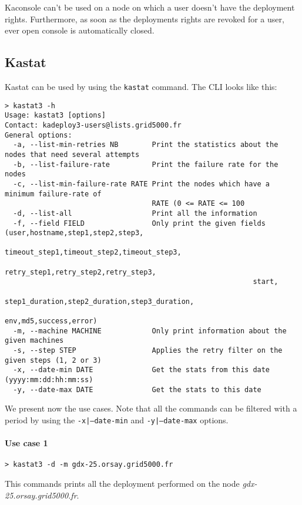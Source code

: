 \documentclass[a4wide,10pt,oneside]{book}
\begin{document}
Kaconsole can't be used on a node on which a user doesn't have the deployment rights. Furthermore, as soon as the deployments rights are revoked for a user, ever open console is automatically closed.

\subsection{Kastat}\label{sec:kastat}
Kastat can be used by using the \texttt{kastat} command. The CLI looks like this:
\begin{small}
\begin{verbatim}
> kastat3 -h
Usage: kastat3 [options]
Contact: kadeploy3-users@lists.grid5000.fr
General options:
  -a, --list-min-retries NB        Print the statistics about the nodes that need several attempts
  -b, --list-failure-rate          Print the failure rate for the nodes
  -c, --list-min-failure-rate RATE Print the nodes which have a minimum failure-rate of 
                                   RATE (0 <= RATE <= 100
  -d, --list-all                   Print all the information
  -f, --field FIELD                Only print the given fields (user,hostname,step1,step2,step3,
                                                           timeout_step1,timeout_step2,timeout_step3,
                                                           retry_step1,retry_step2,retry_step3,
                                                           start,
                                                           step1_duration,step2_duration,step3_duration,
                                                           env,md5,success,error)
  -m, --machine MACHINE            Only print information about the given machines
  -s, --step STEP                  Applies the retry filter on the given steps (1, 2 or 3)
  -x, --date-min DATE              Get the stats from this date (yyyy:mm:dd:hh:mm:ss)
  -y, --date-max DATE              Get the stats to this date
\end{verbatim}
\end{small}

We present now the use cases. Note that all the commands can be filtered with a period by using the \texttt{-x|--date-min} and \texttt{-y|--date-max} options.
\paragraph{Use case 1}
\begin{verbatim}
> kastat3 -d -m gdx-25.orsay.grid5000.fr
\end{verbatim}
This commands prints all the deployment performed on the node \textit{gdx-25.orsay.grid5000.fr}.
\end{document}
